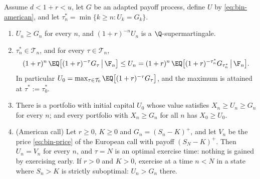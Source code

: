 \begin{theorem}\label{thm:bin-american}
Assume $d<1+r<u$, let $G$ be an adapted payoff process, define $U$ by
\eqref{eq:bin-american}, and let $\tau^*_n=\min\{k\ge n:U_k=G_k\}$.
\begin{enumerate}[label=(\roman*)]
  \item $U_n\ge G_n$ for every $n$, and $(1+r)^{-n}U_n$ is a $\Q$-supermartingale.
  \item $\tau^*_n\in\mathcal T_n$, and for every $\tau\in\mathcal T_n$,
    \[
      (1+r)^n\,\EQ\big[(1+r)^{-\tau}G_\tau\,\big|\,\F_n\big]\le U_n
      =(1+r)^n\,\EQ\big[(1+r)^{-\tau^*_n}G_{\tau^*_n}\,\big|\,\F_n\big].
    \]
    In particular $U_0=\max_{\tau\in\mathcal T_0}\EQ\big[(1+r)^{-\tau}G_\tau\big]$, and the
    maximum is attained at $\tau^*:=\tau^*_0$.
  \item There is a portfolio with initial capital $U_0$ whose value satisfies
    $X_n\ge U_n\ge G_n$ for every $n$; and every portfolio with $X_n\ge G_n$ for all $n$
    has $X_0\ge U_0$.
  \item (American call) Let $r\ge0$, $K\ge0$ and $G_n=(S_n-K)^+$, and let $V_n$ be the
    price \eqref{eq:bin-price} of the European call with payoff $(S_N-K)^+$. Then $U_n=V_n$
    for every $n$, and $\tau=N$ is an optimal exercise time: nothing is gained by exercising
    early. If $r>0$ and $K>0$, exercise at a time $n<N$ in a state where $S_n>K$ is
    strictly suboptimal: $U_n>G_n$ there.
\end{enumerate}
\end{theorem}

